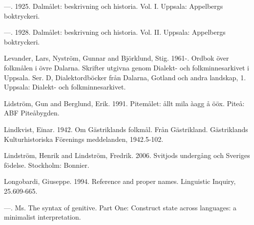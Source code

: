 \begin{styleBodytextC}
—. 1925. Dalmålet: beskrivning och historia. Vol. I. Uppsala: Appelbergs boktryckeri.

\end{styleBodytextC}

\begin{styleBodytextC}
—. 1928. Dalmålet: beskrivning och historia. Vol. II. Uppsala: Appelbergs boktryckeri.

\end{styleBodytextC}

\begin{styleBodytextC}
Levander, Lars, Nyström, Gunnar and Björklund, Stig. 1961-. Ordbok över folkmålen i övre Dalarna. Skrifter utgivna genom Dialekt- och folkminnesarkivet i Uppsala. Ser. D, Dialektordböcker från Dalarna, Gotland och andra landskap, 1. Uppsala: Dialekt- och folkminnesarkivet.

\end{styleBodytextC}

\begin{styleBodytextC}
Lidström, Gun and Berglund, Erik. 1991. Pitemålet: ållt mila àagg å ööx. Piteå: ABF Piteåbygden.

\end{styleBodytextC}

\begin{styleBodytextC}
Lindkvist, Einar. 1942. Om Gästriklands folkmål. Från Gästrikland. Gästriklands Kulturhistoriska Förenings meddelanden, 1942.5-102.

\end{styleBodytextC}

\begin{styleBodytextC}
Lindström, Henrik and Lindström, Fredrik. 2006. Svitjods undergång och Sveriges födelse. Stockholm: Bonnier.

\end{styleBodytextC}

\begin{styleBodytextC}
Longobardi, Giuseppe. 1994. Reference and proper names. Linguistic Inquiry, 25.609-665.

\end{styleBodytextC}

\begin{styleBodytextC}
—. Ms. The syntax of genitive. Part One: Construct state across languages: a minimalist interpretation.

\end{styleBodytextC}

